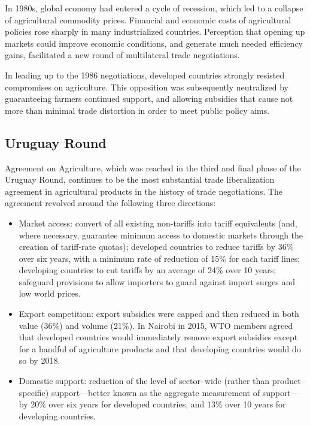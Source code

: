 \documentclass[
]{book}
\providecommand{\tightlist}{%
  \setlength{\itemsep}{0pt}\setlength{\parskip}{0pt}}
\begin{document}
In 1980s, global economy had entered a cycle of recession, which led to a collapse of agricultural commodity prices. Financial and economic costs of agricultural policies rose sharply in many industrialized countries. Perception that opening up markets could improve economic conditions, and generate much needed efficiency gains, facilitated a new round of multilateral trade negotiations.

In leading up to the 1986 negotiations, developed countries strongly resisted compromises on agriculture. This opposition was subsequently neutralized by guaranteeing farmers continued support, and allowing subsidies that cause not more than minimal trade distortion in order to meet public policy aims.

\hypertarget{uruguay-round}{%
\subsection{Uruguay Round}\label{uruguay-round}}

Agreement on Agriculture, which was reached in the third and final phase of the Uruguay Round, continues to be the most substantial trade liberalization agreement in agricultural products in the history of trade negotiations. The agreement revolved around the following three directions:

\begin{itemize}
\tightlist
\item
  Market access: convert of all existing non-tariffs into tariff equivalents (and, where necessary, guarantee minimum access to domestic markets through the creation of tariff-rate quotas); developed countries to reduce tariffs by 36\% over six years, with a minimum rate of reduction of 15\% for each tariff lines; developing countries to cut tariffs by an average of 24\% over 10 years; safeguard provisions to allow importers to guard against import surges and low world prices.
\item
  Export competition: export subsidies were capped and then reduced in both value (36\%) and volume (21\%). In Nairobi in 2015, WTO members agreed that developed countries would immediately remove export subsidies except for a handful of agriculture products and that developing countries would do so by 2018.
\item
  Domestic support: reduction of the level of sector--wide (rather than product--specific) support---better known as the aggregate measurement of support---by 20\% over six years for developed countries, and 13\% over 10 years for developing countries.
\end{itemize}
\end{document}
